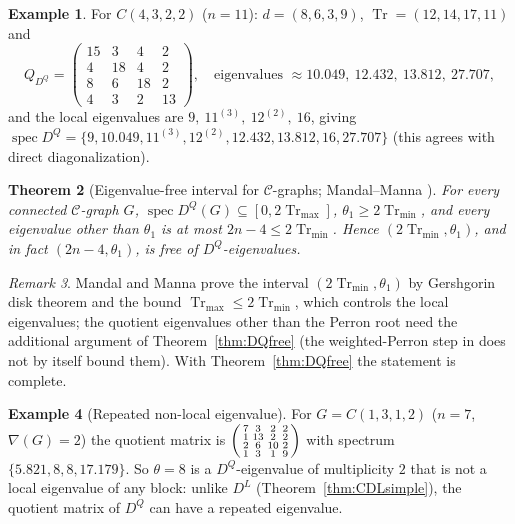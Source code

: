 \documentclass[11pt]{article}
\theoremstyle{plain}
\newtheorem{theorem}{Theorem}[section]
\theoremstyle{definition}
\newtheorem{example}[theorem]{Example}
\theoremstyle{remark}
\newtheorem{remark}[theorem]{Remark}
\DeclareMathOperator{\spec}{spec}
\DeclareMathOperator{\Tr}{Tr}
\begin{document}
	\begin{example}
		For $C(4,3,2,2)$ ($n=11$): $d=(8,6,3,9)$, $\Tr=(12,14,17,11)$ and
		\[
		Q_{D^Q}=\begin{pmatrix}15&3&4&2\\4&18&4&2\\8&6&18&2\\4&3&2&13\end{pmatrix},\quad \text{eigenvalues }\approx 10.049,\ 12.432,\ 13.812,\ 27.707,
		\]
		and the local eigenvalues are $9,\ 11^{(3)},\ 12^{(2)},\ 16$, giving $\spec D^Q=\{9,10.049,11^{(3)},12^{(2)},12.432,13.812,16,27.707\}$ (this agrees with direct diagonalization).
	\end{example}
	
	\begin{theorem}[Eigenvalue-free interval for $\mathcal C$-graphs; Mandal--Manna \cite{MandalManna2026DLDQ}]
		\label{thm:CDQfree}
		For every connected $\mathcal C$-graph $G$, $\spec D^Q(G)\subseteq[0,2\Tr_{\max}]$, $\theta_1\ge2\Tr_{\min}$, and every eigenvalue other than $\theta_1$ is at most $2n-4\le 2\Tr_{\min}$. Hence $(2\Tr_{\min},\theta_1)$, and in fact $(2n-4,\theta_1)$, is free of $D^Q$-eigenvalues.
	\end{theorem}
	\begin{remark}
		Mandal and Manna prove the interval $(2\Tr_{\min},\theta_1)$ by Gershgorin disk theorem and the bound $\operatorname{Tr}_{\max}\le2\operatorname{Tr}_{\min}$, which controls the local eigenvalues; the quotient eigenvalues other than the Perron root need the additional argument of Theorem~\ref{thm:DQfree} (the weighted-Perron step in \cite{MandalManna2026DLDQ} does not by itself bound them). With Theorem~\ref{thm:DQfree} the statement is complete.
	\end{remark}
	
	\begin{example}[Repeated non-local eigenvalue]
		\label{ex:DQrepeat}
		For $G=C(1,3,1,2)$ ($n=7$, $\nabla(G)=2$) the quotient matrix is $\begin{psmallmatrix}7&3&2&2\\1&13&2&2\\2&6&10&2\\1&3&1&9\end{psmallmatrix}$ with spectrum $\{5.821,8,8,17.179\}$. So $\theta=8$ is a $D^Q$-eigenvalue of multiplicity $2$ that is not a local eigenvalue of any block: unlike $D^L$ (Theorem~\ref{thm:CDLsimple}), the quotient matrix of $D^Q$ can have a repeated eigenvalue.
	\end{example}
	
\end{document}
